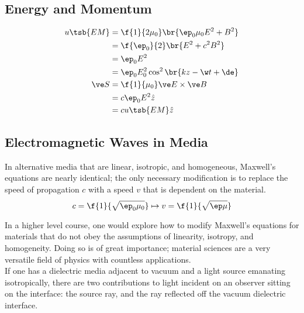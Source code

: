 \documentclass{article}
\begin{document}
\subsection{Energy and Momentum}
\begin{align*}
    u\tsb{EM}
    &= \f{1}{2 \mu_0} \br{\ep_0 \mu_0 E^2 + B^2} \\
    &= \f{\ep_0}{2} \br{E^2 + c^2B^2} \\
    &= \ep_0 E^2 \\
    &= \ep_0 E_0^2 \cos^2\br{kz - \w t + \de} \\
    \ve S &= \f{1}{\mu_0} \ve E \times \ve B \\
    &= c \ep_0 E^2 \hat z \\
    &= c u\tsb{EM} \hat z\\
\end{align*}

\subsection{Electromagnetic Waves in Media}


In alternative media that are linear, isotropic, and homogeneous, Maxwell's equations are nearly identical; the only necessary modification is to replace the speed of propagation $c$ with a speed $v$ that is dependent on the material.
\[ c = \f{1}{\sqrt{\ep_0 \mu_0}} \mapsto v = \f{1}{\sqrt{\ep \mu}} \]

In a higher level course, one would explore how to modify Maxwell's equations for materials that do not obey the assumptions of linearity, isotropy, and homogeneity. Doing so is of great importance; material sciences are a very versatile field of physics with countless applications. \\

If one has a dielectric media adjacent to vacuum and a light source emanating isotropically, there are two contributions to light incident on an observer sitting on the interface: the source ray, and the ray reflected off the vacuum dielectric interface.

\begin{center}
\end{center}
\end{document}
